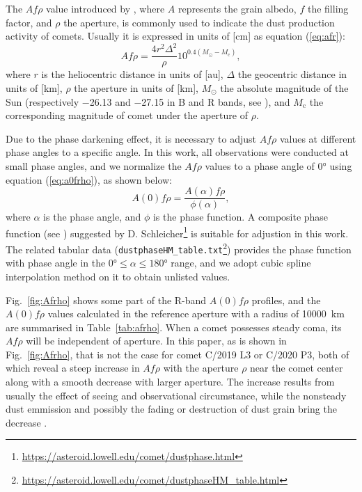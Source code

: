 The $Af\rho$ value introduced by \citet{ahearn_comet_1984}, where $A$ represents the grain albedo, $f$ the filling factor, and $\rho$ the aperture, is commonly used to indicate the dust production activity of comets. Usually it is expressed in units of [\unit{\cm}] as equation (\ref{eq:afr}): 
\begin{equation}
    Af\rho = \frac{4 r^2 \Delta^2}{\rho} 10^{0.4(M_\odot - M_\mathrm{c})}, 
    \label{eq:afr}
\end{equation}
where $r$ is the heliocentric distance in units of [\unit{\astronomicalunit}], $\Delta$ the geocentric distance in units of [\unit{\km}], $\rho$ the aperture in units of [\unit{\km}], $M_\odot$ the absolute magnitude of the Sun (respectively \num{-26.13} and \num{-27.15} in B and R bands, see \citealt{willmer_absolute_2018}), and $M_\mathrm{c}$ the corresponding magnitude of comet under the aperture of $\rho$. 

Due to the phase darkening effect, it is necessary to adjust $Af\rho$ values at different phase angles to a specific angle. In this work, all observations were conducted at small phase angles, and we normalize the $Af\rho$ values to a phase angle of \ang{0} using equation (\ref{eq:a0frho}), as shown below:
\begin{equation}
    A(0)f\rho = \frac{A(\alpha)f\rho}{\phi(\alpha)}, \label{eq:a0frho}
\end{equation}
where $\alpha$ is the phase angle, and $\phi$ is the phase function. A composite phase function (see \citealt{schleicher_composition_2011, marcus_forward-scattering_2007}) suggested by D. Schleicher\footnote{\url{https://asteroid.lowell.edu/comet/dustphase.html}} is suitable for adjustion in this work. The related tabular data (\verb|dustphaseHM_table.txt|\footnote{\url{https://asteroid.lowell.edu/comet/dustphaseHM_table.html}}) provides the phase function with phase angle in the $\ang{0} \leqslant \alpha \leqslant \ang{180}$ range, and we adopt cubic spline interpolation method on it to obtain unlisted values. 

Fig.~\ref{fig:Afrho} shows some part of the R-band $A(0)f\rho$ profiles, and the $A(0)f\rho$ values calculated in the reference aperture with a radius of \qty{10000}{\km} are summarised in Table~\ref{tab:afrho}. When a comet possesses steady coma, its $Af\rho$ will be independent of aperture. In this paper, as is shown in Fig.~\ref{fig:Afrho}, that is not the case for comet C/2019 L3 or C/2020 P3, both of which reveal a steep increase in $Af\rho$ with the aperture $\rho$ near the comet center along with a smooth decrease with larger aperture. The increase results from usually the effect of seeing and observational circumstance, while the nonsteady dust emmission and possibly the fading or destruction of dust grain bring the decrease \citep{lara_behaviour_2003,tozzi_imaging_2003}.  

